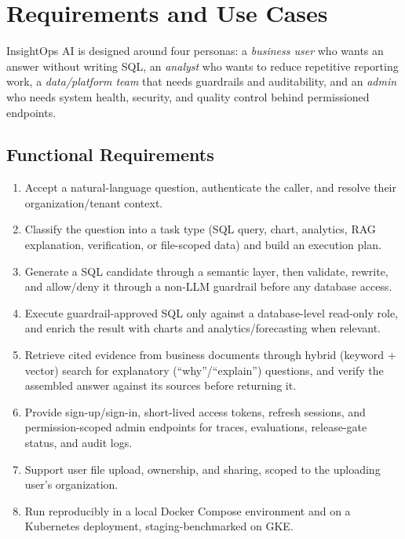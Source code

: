 \documentclass[conference]{IEEEtran}
\begin{document}
\section{Requirements and Use Cases}

InsightOps AI is designed around four personas: a \emph{business user} who
wants an answer without writing SQL, an \emph{analyst} who wants to reduce
repetitive reporting work, a \emph{data/platform team} that needs
guardrails and auditability, and an \emph{admin} who needs system health,
security, and quality control behind permissioned endpoints.

\subsection{Functional Requirements}
\begin{enumerate}
    \item Accept a natural-language question, authenticate the caller, and
    resolve their organization/tenant context.
    \item Classify the question into a task type (SQL query, chart,
    analytics, RAG explanation, verification, or file-scoped data) and
    build an execution plan.
    \item Generate a SQL candidate through a semantic layer, then validate,
    rewrite, and allow/deny it through a non-LLM guardrail before any
    database access.
    \item Execute guardrail-approved SQL only against a database-level
    read-only role, and enrich the result with charts and
    analytics/forecasting when relevant.
    \item Retrieve cited evidence from business documents through hybrid
    (keyword + vector) search for explanatory (``why''/``explain'')
    questions, and verify the assembled answer against its sources before
    returning it.
    \item Provide sign-up/sign-in, short-lived access tokens, refresh
    sessions, and permission-scoped admin endpoints for traces,
    evaluations, release-gate status, and audit logs.
    \item Support user file upload, ownership, and sharing, scoped to the
    uploading user's organization.
    \item Run reproducibly in a local Docker Compose environment and on a
    Kubernetes deployment, staging-benchmarked on GKE.
\end{enumerate}
\end{document}
